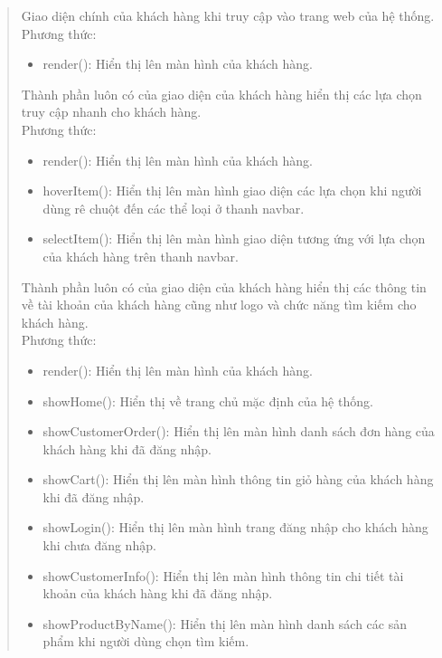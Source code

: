 \begin{quote}
 
    Giao diện chính của khách hàng khi truy cập vào trang web của hệ thống.\\
    Phương thức:
    \begin{itemize}
        \item render(): Hiển thị lên màn hình của khách hàng.
    \end{itemize}
   
    Thành phần luôn có của giao diện của khách hàng hiển thị các lựa chọn truy cập nhanh cho khách hàng.\\
    Phương thức:
    \begin{itemize}
        \item render(): Hiển thị lên màn hình của khách hàng.
        \item hoverItem(): Hiển thị lên màn hình giao diện các lựa chọn khi người dùng rê chuột đến các thể loại ở thanh navbar.
        \item selectItem(): Hiển thị lên màn hình giao diện tương ứng với lựa chọn của khách hàng trên thanh navbar.
    \end{itemize}
   
    Thành phần luôn có của giao diện của khách hàng hiển thị các thông tin về tài khoản của khách hàng cũng như logo và chức năng tìm kiếm cho khách hàng.\\
    Phương thức:
    \begin{itemize}
        \item render(): Hiển thị lên màn hình của khách hàng.
        \item showHome(): Hiển thị về trang chủ mặc định của hệ thống.
        \item showCustomerOrder(): Hiển thị lên màn hình danh sách đơn hàng của khách hàng khi đã đăng nhập.
        \item showCart(): Hiển thị lên màn hình thông tin giỏ hàng của khách hàng khi đã đăng nhập.
        \item showLogin(): Hiển thị lên màn hình trang đăng nhập cho khách hàng khi chưa đăng nhập.
        \item showCustomerInfo(): Hiển thị lên màn hình thông tin chi tiết tài khoản của khách hàng khi đã đăng nhập.
        \item showProductByName(): Hiển thị lên màn hình danh sách các sản phẩm khi người dùng chọn tìm kiếm.
    \end{itemize}
   

\end{quote}
